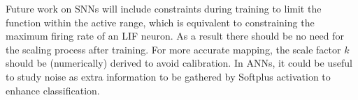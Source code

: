 	Future work on SNNs will include constraints during training to limit the function within the active range, which is equivalent to constraining the maximum firing rate of an LIF neuron.
	As a result there should be no need for the scaling process after training.
	For more accurate mapping, the scale factor $k$ should be (numerically) derived to avoid calibration.
	In ANNs, it could be useful to study noise as extra information to be gathered by Softplus activation to enhance classification.